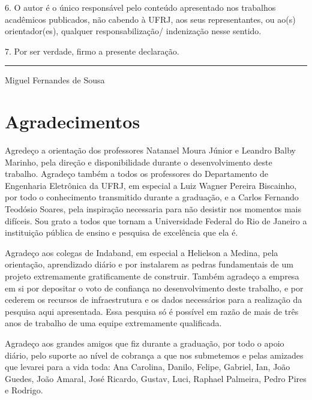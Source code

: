 \documentclass[tcc,numbers]{coppe}
\begin{document}
6. O autor é o único responsável pelo conteúdo apresentado nos trabalhos
acadêmicos publicados, não cabendo à UFRJ, aos seus representantes, ou ao(s)
orientador(es), qualquer responsabilização/ indenização nesse sentido.

7. Por ser verdade, firmo a presente declaração.

\vspace{4\baselineskip}

\noindent\hfill \rule{4in}{0.7pt}

\noindent\hfill Miguel Fernandes de Sousa
\newpage


  \dedication{Aos meus avós, Dona Filinha e Wilton.}

  \chapter*{Agradecimentos}

  Agredeço a orientação dos professores Natanael Moura Júnior e Leandro Balby
  Marinho, pela direção e disponibilidade durante o desenvolvimento deste
  trabalho. Agradeço também a todos os professores do Departamento de Engenharia
  Eletrônica da UFRJ, em especial a Luiz Wagner Pereira Biscainho, por todo o
  conhecimento transmitido durante a graduação, e a Carlos Fernando Teodósio
  Soares, pela inspiração necessaria para não desistir nos momentos mais
  difíceis. Sou grato a todos que tornam a Universidade Federal do Rio de
  Janeiro a instituição pública de ensino e pesquisa de excelência que ela é.
 
  Agradeço aos colegas de Indaband, em especial a Helielson a Medina, pela
  orientação, aprendizado diário e por instalarem as pedras fundamentais de um
  projeto extremamente gratificamente de construir. Também agradeço a empresa em
  si por depositar o voto de confiança no desenvolvimento deste trabalho, e
  por cederem os recursos de infraestrutura e os dados necessários para a
  realização da pesquisa aqui apresentada. Essa pesquisa só é possível em razão
  de mais de três anos de trabalho de uma equipe extremamente qualificada.

  Agradeço aos grandes amigos que fiz durante a graduação, por todo o apoio
  diário, pelo suporte ao nível de cobrança a que nos submetemos e pelas
  amizades que levarei para a vida toda: Ana Carolina, Danilo, Felipe, Gabriel,
  Ian, João Guedes, João Amaral, José Ricardo, Gustav, Luci, Raphael Palmeira,
  Pedro Pires e Rodrigo.
\end{document}
